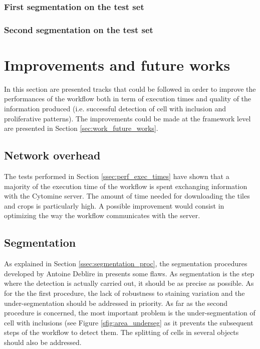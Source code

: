 \subsubsection{First segmentation on the test set}
\label{sssec:perf_second_test}
\subsubsection{Second segmentation on the test set}
\label{sssec:perf_third_test}

\section{Improvements and future works}

In this section are presented tracks that could be followed in order to improve the performances of the workflow both in term of execution times and quality of the information produced (i.e. successful detection of cell with inclusion and proliferative patterns). The improvements could be made at the framework level are presented in Section \ref{sec:work_future_works}.

\subsection{Network overhead}
The tests performed in Section \ref{ssec:perf_exec_times} have shown that a majority of the execution time of the workflow is spent exchanging information with the Cytomine server. The amount of time needed for downloading the tiles and crops is particularly high. A possible improvement would consist in optimizing the way the workflow communicates with the server. 

\subsection{Segmentation}
As explained in Section \ref{ssec:segmentation_proc}, the segmentation procedures developed by Antoine Deblire in \cite{adeblire2013} presents some flaws. As segmentation is the step where the detection is actually carried out, it should be as precise as possible. As for the the first procedure, the lack of robustness to staining variation and the under-segmentation should be addressed in priority. As far as the second procedure is concerned, the most important problem is the under-segmentation of cell with inclusions (see Figure \ref{sfig:area_underseg} as it prevents the subsequent steps of the workflow to detect them. The splitting of cells in several objects should also be addressed. 

